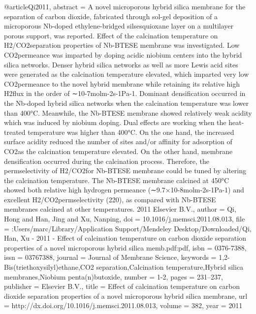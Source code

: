 @article{Qi2011,
abstract = {A novel microporous hybrid silica membrane for the separation of carbon dioxide, fabricated through sol-gel deposition of a microporous Nb-doped ethylene-bridged silsesquioxane layer on a multilayer porous support, was reported. Effect of the calcination temperature on H2/CO2separation properties of Nb-BTESE membrane was investigated. Low CO2permeance was imparted by doping acidic niobium centers into the hybrid silica networks. Denser hybrid silica networks as well as more Lewis acid sites were generated as the calcination temperature elevated, which imparted very low CO2permeance to the novel hybrid membrane while retaining its relative high H2flux in the order of ∼10-7molm-2s-1Pa-1. Dominant densification occurred in the Nb-doped hybrid silica networks when the calcination temperature was lower than 400°C. Meanwhile, the Nb-BTESE membrane showed relatively weak acidity which was induced by niobium doping. Dual effects are working when the heat-treated temperature was higher than 400°C. On the one hand, the increased surface acidity reduced the number of sites and/or affinity for adsorption of CO2as the calcination temperature elevated. On the other hand, membrane densification occurred during the calcination process. Therefore, the permselectivity of H2/CO2for Nb-BTESE membrane could be tuned by altering the calcination temperature. The Nb-BTESE membrane calcined at 450°C showed both relative high hydrogen permeance (∼9.7×10-8molm-2s-1Pa-1) and excellent H2/CO2permselectivity (220), as compared with Nb-BTESE membranes calcined at other temperatures. {\textcopyright} 2011 Elsevier B.V.},
author = {Qi, Hong and Han, Jing and Xu, Nanping},
doi = {10.1016/j.memsci.2011.08.013},
file = {:Users/marc/Library/Application Support/Mendeley Desktop/Downloaded/Qi, Han, Xu - 2011 - Effect of calcination temperature on carbon dioxide separation properties of a novel microporous hybrid silica memb.pdf:pdf},
isbn = {0376-7388},
issn = {03767388},
journal = {Journal of Membrane Science},
keywords = {1,2-Bis(triethoxysilyl)ethane,CO2 separation,Calcination temperature,Hybrid silica membranes,Niobium penta(n)butoxide},
number = {1-2},
pages = {231--237},
publisher = {Elsevier B.V.},
title = {{Effect of calcination temperature on carbon dioxide separation properties of a novel microporous hybrid silica membrane}},
url = {http://dx.doi.org/10.1016/j.memsci.2011.08.013},
volume = {382},
year = {2011}
}
